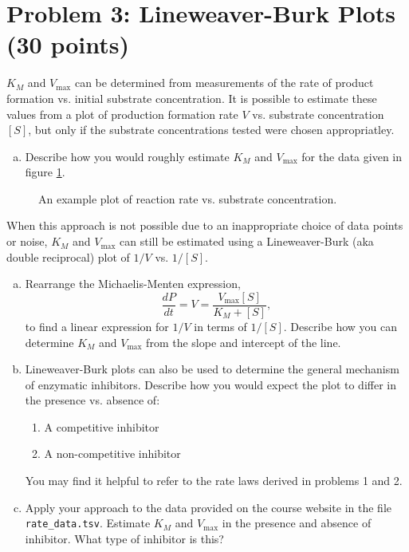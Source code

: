 \documentclass{article}
\begin{document}
\section*{Problem 3: Lineweaver-Burk Plots (30 points)}

$K_M$ and $V_{\textrm{max}}$ can be determined from measurements of the rate of product formation vs. initial substrate concentration. It is possible to estimate these values from a plot of production formation rate $V$ vs. substrate concentration $[S]$, but only if the substrate concentrations tested were chosen appropriatley.

\begin{enumerate}[a)]
\setlength{\itemsep}{0pt}
\item Describe how you would roughly estimate $K_M$ and $V_{\textrm{max}}$ for the data given in figure \ref{fig:mm}.
\end{enumerate}

\begin{figure}[htp] 
\caption{An example plot of reaction rate vs. substrate concentration.} \label{fig:mm}
\end{figure}  

When this approach is not possible due to an inappropriate choice of data points or noise, $K_M$ and $V_{\textrm{max}}$ can still be estimated using a Lineweaver-Burk (aka double reciprocal) plot of $1/V$ vs. $1/[S]$.

\begin{enumerate}[a)]
\setlength{\itemsep}{0pt}
\setcounter{enumi}{1}
\item Rearrange the Michaelis-Menten expression,
\[ \frac{dP}{dt} = V = \frac{V_{\textrm{max}} \left[ S \right]}{K_M + \left[ S \right]}, \]
to find a linear expression for $1/V$ in terms of $1/[S]$. Describe how you can determine $K_M$ and $V_{\textrm{max}}$ from the slope and intercept of the line.
\item Lineweaver-Burk plots can also be used to determine the general mechanism of enzymatic inhibitors. Describe how you would expect the plot to differ in the presence vs. absence of:
\begin{enumerate}
\item A competitive inhibitor
\item A non-competitive inhibitor
\end{enumerate}
You may find it helpful to refer to the rate laws derived in problems 1 and 2.
\item Apply your approach to the data provided on the course website in the file \texttt{rate\_data.tsv}. Estimate $K_M$ and $V_{\textrm{max}}$ in the presence and absence of inhibitor. What type of inhibitor is this?
\end{enumerate}
\end{document}
